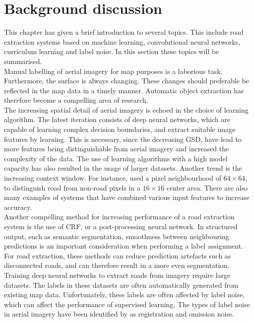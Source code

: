 \section{Background discussion}
\label{sec:backgroundDiscussion}
This chapter has given a brief introduction to several topics. This include  road extraction systems based on machine learning, convolutional neural networks, curriculum learning and label noise. In this section these topics will be summarised. \\

Manual labelling of aerial imagery for map purposes is a laborious task. Furthermore, the surface is always changing. These changes should preferable be reflected in the map data in a timely manner. Automatic object extraction has therefore become a compelling area of research.\\

The increasing spatial detail of aerial imagery is echoed in the choice of learning algorithm. The latest iteration consists of deep neural networks, which are capable of learning complex decision boundaries, and extract suitable image features by learning. This is necessary, since the decreasing \ac{GSD}, have  lead to more features being distinguishable from aerial imagery and increased the complexity of the data. The use of learning algorithms with a high model capacity has also resulted in the usage of larger datasets. Another trend is the increasing context window. For instance, \cite{Mnih_roads_high_res_aerial_images} used a pixel neighbourhood of $64 \times 64$, to distinguish road from non-road pixels in a $16 \times 16$   center area. There are also many examples of systems that have combined various input features to increase accuracy.\\

Another compelling method for increasing performance of a road extraction system is the use of \ac{CRF}, or a post-processing neural network. In structured output, such as semantic segmentation,  smoothness between neighbouring predictions is an important consideration when performing a label assignment. For road extraction, these methods can reduce prediction artefacts such as disconnected roads, and can therefore result in a more even segmentation.\\

Training deep neural networks to extract roads from imagery require large datasets. The labels in these datasets are often automatically generated from existing map data. Unfortunately, these labels are often affected by label noise, which can affect the performance of supervised learning. The types of label noise in aerial imagery have been identified by \cite{Mnih_aerial_images_noisy} as registration and omission noise.  \\

